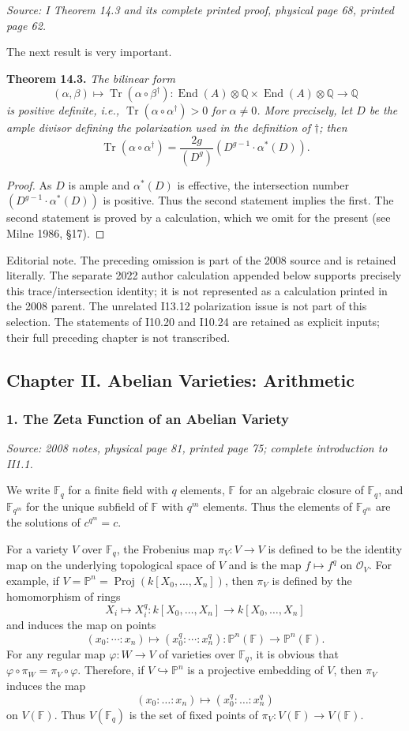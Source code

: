 \documentclass[11pt]{article}
\DeclareMathOperator{\AVEnd}{End}
\DeclareMathOperator{\AVTr}{Tr}
\DeclareMathOperator{\AVProj}{Proj}
\newcommand{\AVQ}{\mathbb{Q}}
\newcommand{\AVF}{\mathbb{F}}
\newcommand{\AVP}{\mathbb{P}}
\newcommand{\AVsrc}[1]{\par\smallskip\noindent\textit{Source: #1.}\par\smallskip}
\newcommand{\AVeditorial}[1]{\par\smallskip\noindent\textsf{Editorial note.} #1\par\smallskip}
\begin{document}
\AVsrc{I Theorem 14.3 and its complete printed proof, physical page 68, printed page 62}
The next result is very important.

\noindent\textbf{Theorem 14.3.}
\emph{The bilinear form}
\[
(\alpha,\beta)\longmapsto\AVTr(\alpha\circ\beta^{\dagger}):
\AVEnd(A)\otimes\AVQ\times\AVEnd(A)\otimes\AVQ\longrightarrow\AVQ
\]
\emph{is positive definite, i.e., $\AVTr(\alpha\circ\alpha^{\dagger})>0$
for $\alpha\ne0$. More precisely, let $D$ be the ample divisor defining
the polarization used in the definition of $\dagger$; then}
\[
\AVTr(\alpha\circ\alpha^{\dagger})
=\frac{2g}{(D^g)}(D^{g-1}\cdot\alpha^*(D)).
\]
\begin{proof}
As $D$ is ample and $\alpha^*(D)$ is effective, the intersection number
$(D^{g-1}\cdot\alpha^*(D))$ is positive. Thus the second statement implies
the first. The second statement is proved by a calculation, which we omit
for the present (see Milne 1986, \S17).
\end{proof}

\AVeditorial{The preceding omission is part of the 2008 source and is
retained literally. The separate 2022 author calculation appended below
supports precisely this trace/intersection identity; it is not represented
as a calculation printed in the 2008 parent. The unrelated I13.12
polarization issue is not part of this selection. The statements of
I10.20 and I10.24 are retained as explicit inputs; their full preceding
chapter is not transcribed.}

\subsection*{Chapter II. Abelian Varieties: Arithmetic}
\subsubsection*{1. The Zeta Function of an Abelian Variety}
\AVsrc{2008 notes, physical page 81, printed page 75; complete introduction to II1.1}
We write $\AVF_q$ for a finite field with $q$ elements, $\AVF$ for an
algebraic closure of $\AVF_q$, and $\AVF_{q^m}$ for the unique subfield
of $\AVF$ with $q^m$ elements. Thus the elements of $\AVF_{q^m}$ are the
solutions of $c^{q^m}=c$.

For a variety $V$ over $\AVF_q$, the Frobenius map $\pi_V:V\to V$ is
defined to be the identity map on the underlying topological space of $V$
and is the map $f\mapsto f^q$ on $\mathcal O_V$. For example, if
$V=\AVP^n=\AVProj(k[X_0,\ldots,X_n])$, then $\pi_V$ is defined by the
homomorphism of rings
\[
X_i\longmapsto X_i^q:
k[X_0,\ldots,X_n]\longrightarrow k[X_0,\ldots,X_n]
\]
and induces the map on points
\[
(x_0:\cdots:x_n)\longmapsto(x_0^q:\cdots:x_n^q):
\AVP^n(\AVF)\longrightarrow\AVP^n(\AVF).
\]
For any regular map $\varphi:W\to V$ of varieties over $\AVF_q$, it is
obvious that $\varphi\circ\pi_W=\pi_V\circ\varphi$. Therefore, if
$V\hookrightarrow\AVP^n$ is a projective embedding of $V$, then $\pi_V$
induces the map
\[
(x_0:\ldots:x_n)\longmapsto(x_0^q:\ldots:x_n^q)
\]
on $V(\AVF)$. Thus $V(\AVF_q)$ is the set of fixed points of
$\pi_V:V(\AVF)\to V(\AVF)$.
\end{document}
